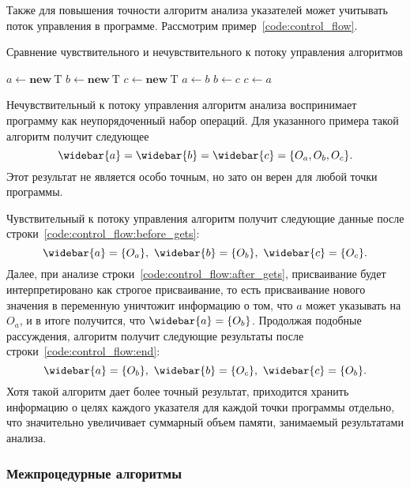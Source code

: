 \documentclass[14pt,titlepage,draft]{extarticle}
\newcommand{\type}[1]{\mathrm{#1}}
\newcommand{\op}[1]{\mathbf{#1}}
\newcommand{\pts}[1]{\widebar{#1}}
\begin{document}
        Также для повышения точности алгоритм анализа указателей может
        учитывать поток управления в программе.
        Рассмотрим пример~\ref{code:control_flow}.

        \begin{algorithm}
          \caption{Сравнение чувствительного и нечувствительного к потоку
                   управления алгоритмов}
          \label{code:control_flow}
          \begin{algorithmic}[1]
            \State $a \gets \op{new}~\type{T}$
            \State $b \gets \op{new}~\type{T}$
            \State $c \gets \op{new}~\type{T}$ \label{code:control_flow:before_gets}
            \State $a \gets b$ \label{code:control_flow:after_gets}
            \State $b \gets c$
            \State $c \gets a$ \label{code:control_flow:end}
          \end{algorithmic}
        \end{algorithm}

        Нечувствительный к потоку управления алгоритм анализа воспринимает
        программу как неупорядоченный набор операций.
        Для указанного примера такой алгоритм получит следующее
        \[\pts{a} = \pts{b} = \pts{c} = \{O_a, O_b, O_c\}.\]
        Этот результат не является особо точным, но зато он верен
        для любой точки программы.

        Чувствительный к потоку управления алгоритм получит следующие данные
        после строки~\ref{code:control_flow:before_gets}:
        \[\pts{a} = \{O_a\},\ \pts{b} = \{O_b\},\ \pts{c} = \{O_c\}.\]
        Далее, при анализе строки~\ref{code:control_flow:after_gets},
        присваивание будет интерпретировано как строгое присваивание,
        то есть присваивание нового значения в переменную уничтожит
        информацию о том, что $a$ может указывать на $O_a$, и в итоге
        получится, что $\pts{a} = \{O_b\}$. Продолжая подобные рассуждения,
        алгоритм получит следующие результаты после
        строки~\ref{code:control_flow:end}:
        \[\pts{a} = \{O_b\},\ \pts{b} = \{O_c\},\ \pts{c} = \{O_b\}.\]
        Хотя такой алгоритм дает более точный результат, приходится хранить
        информацию о целях каждого указателя для каждой точки программы
        отдельно, что значительно увеличивает суммарный объем памяти,
        занимаемый результатами анализа.

      \subsubsection{Межпроцедурные алгоритмы}
\end{document}
